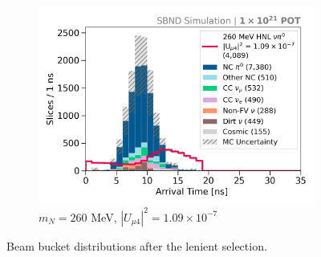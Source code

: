 \begin{figure}[hb!]
\begin{subfigure}[b]{0.495\textwidth}
            \includegraphics[width=\textwidth]{m260}
            \caption{$m_N = 260$ MeV, $|U_{\mu4}|^2 = 1.09 \times 10^{-7}$ }
        \end{subfigure}
        \caption[Lenient Beam Bucket Distributions in the Mass Range 220 - 260 MeV]{
	Beam bucket distributions after the lenient selection.
	}
\end{figure}
